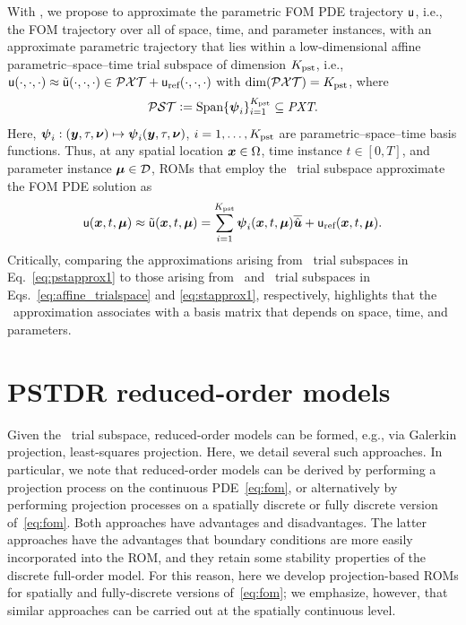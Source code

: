 \documentclass[3p,computermodern,10pt]{elsarticle}
\begin{document}
With \parametricSpaceTimeAcronym, we propose to approximate the parametric FOM PDE trajectory $\mathsf{u}$, i.e., the FOM trajectory over all of space, time, and parameter instances, with an approximate parametric trajectory that lies within a low-dimensional affine parametric--space--time trial subspace of dimension $K_{\text{pst}}$, i.e., $\mathsf{u}(\cdot,\cdot,\cdot) \approx \tilde{\mathsf{u}}(\cdot,\cdot,\cdot) \in \mathcal{PXT} + \mathsf{u}_{\text{ref}}(\cdot,\cdot,\cdot)$ with $\dim(\mathcal{PXT}) = K_{\text{pst}}$, where
\begin{equation}\label{eq:psttrialspace_def}
 \mathcal{PST} \vcentcolon= 
        \text{Span}\{\boldsymbol \psi_i\}_{i=1}^{K_{\text{pst}}} 
        \subseteq \textit{PXT}.
\end{equation}
Here, $\boldsymbol \psi_i: (\boldsymbol y,\tau,\boldsymbol \nu) \mapsto \boldsymbol \psi_i(\boldsymbol y,\tau,\boldsymbol \nu)$, $i=1,\ldots,K_{\text{pst}}$ are parametric--space--time basis functions.  Thus, at any spatial location $\boldsymbol x \in \Omega$, time instance $t\in[0,T]$, and parameter instance $\boldsymbol \mu \in \mathcal{D}$, ROMs that employ the
\parametricSpaceTimeAcronym\ trial subspace approximate the FOM PDE solution as
\begin{equation}\label{eq:pstapprox1}
 \mathsf{u}(\boldsymbol x, t,\boldsymbol \mu) \approx \tilde{\mathsf{u}}(\boldsymbol x, t,\boldsymbol \mu) = \sum_{i=1}^{K_{\text{pst}}} \boldsymbol \psi_i(\boldsymbol x, t,\boldsymbol \mu) \overline{\hat{\boldsymbol u}} + \mathsf{u}_{\text{ref}}(\boldsymbol x, t,\boldsymbol \mu).
\end{equation}
Critically, comparing the approximations arising from \parametricSpaceTimeAcronym\ trial subspaces in Eq.~\eqref{eq:pstapprox1} to those arising from \spatialAcronym\ and
\spaceTimeAcronym\ trial subspaces in Eqs.~\eqref{eq:affine_trialspace} and \eqref{eq:stapprox1}, respectively,
highlights that the \parametricSpaceTimeAcronym\ approximation associates with a basis matrix that depends on space, time, and parameters. 

\section{PSTDR reduced-order models}
Given the \parametricSpaceTimeAcronym\ trial subspace, reduced-order models can be formed, e.g., via Galerkin projection, least-squares projection. Here, we detail several such approaches. In particular, we note that reduced-order models can be derived by performing a projection process on the continuous PDE~\eqref{eq:fom}, or alternatively by performing projection processes on a spatially discrete or fully discrete version of~\eqref{eq:fom}. Both approaches have advantages and disadvantages. The latter approaches have the advantages that boundary conditions are more easily incorporated into the ROM, and they retain some stability properties of the discrete full-order model. For this reason, here we develop projection-based ROMs for spatially and fully-discrete versions of~\eqref{eq:fom}; we emphasize, however, that similar approaches can be carried out at the spatially continuous level.
\end{document}
